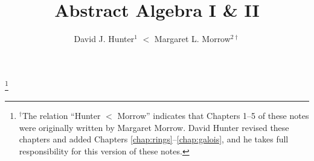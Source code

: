 %
\usepackage{graphicx}
\usepackage{enumitem}

\usepackage{thmtools}
\theoremstyle{definition}

\usepackage{amscd} %
\usepackage{tikz} %
\usetikzlibrary{shapes.misc}


\newcommand*\notesymbol[1]{\tikz{
            \node[shape=rounded rectangle,fill=yellow!25,draw,inner xsep=2pt, inner ysep=2pt] (char) {#1};}}
\renewcommand{\makeenmark}{\notesymbol{\scriptsize\theenmark}\hspace{3pt}}

\newcommand{\ZZ}{\mathbb{Z}}
\newcommand{\NN}{\mathbb{N}}
\newcommand{\QQ}{\mathbb{Q}}
\newcommand{\RR}{\mathbb{R}}
\newcommand{\CC}{\mathbb{C}}
\newcommand{\FF}{\mathbb{F}}
\DeclareMathOperator{\stab}{stab}
\DeclareMathOperator{\Irr}{Irr}
\DeclareMathOperator{\Gal}{Gal}
\DeclareMathOperator{\Ker}{Ker}

%
\StudentVersion
%
\newcommand\blfootnote[1]{%
  \begingroup
  \renewcommand\thefootnote{}\footnote{#1}%
  \addtocounter{footnote}{-1}%
  \endgroup
}


\large
\frontmatter
\title{Abstract Algebra I \& II}
\author{David J. Hunter$^1$ $<$ Margaret L. Morrow$^{2\dagger}$}
\blfootnote{$^\dagger$The relation ``Hunter $<$ Morrow'' indicates that Chapters 1--5 of these notes were originally written by Margaret Morrow. David Hunter revised these chapters and added Chapters \ref{chap:rings}--\ref{chap:galois}, and he takes full responsibility for this version of these notes.}
\maketitle

